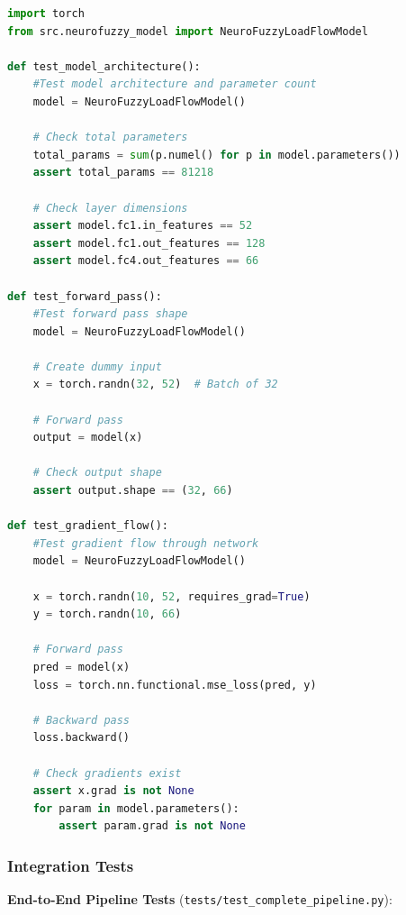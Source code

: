 \documentclass[12pt,a4paper]{report}
\begin{document}
\begin{lstlisting}[language=Python, caption={Neural Network Tests}]
import torch
from src.neurofuzzy_model import NeuroFuzzyLoadFlowModel

def test_model_architecture():
    #Test model architecture and parameter count
    model = NeuroFuzzyLoadFlowModel()
    
    # Check total parameters
    total_params = sum(p.numel() for p in model.parameters())
    assert total_params == 81218
    
    # Check layer dimensions
    assert model.fc1.in_features == 52
    assert model.fc1.out_features == 128
    assert model.fc4.out_features == 66

def test_forward_pass():
    #Test forward pass shape
    model = NeuroFuzzyLoadFlowModel()
    
    # Create dummy input
    x = torch.randn(32, 52)  # Batch of 32
    
    # Forward pass
    output = model(x)
    
    # Check output shape
    assert output.shape == (32, 66)

def test_gradient_flow():
    #Test gradient flow through network
    model = NeuroFuzzyLoadFlowModel()
    
    x = torch.randn(10, 52, requires_grad=True)
    y = torch.randn(10, 66)
    
    # Forward pass
    pred = model(x)
    loss = torch.nn.functional.mse_loss(pred, y)
    
    # Backward pass
    loss.backward()
    
    # Check gradients exist
    assert x.grad is not None
    for param in model.parameters():
        assert param.grad is not None
\end{lstlisting}

\subsubsection{Integration Tests}

\textbf{End-to-End Pipeline Tests} (\texttt{tests/test\_complete\_pipeline.py}):
\end{document}
